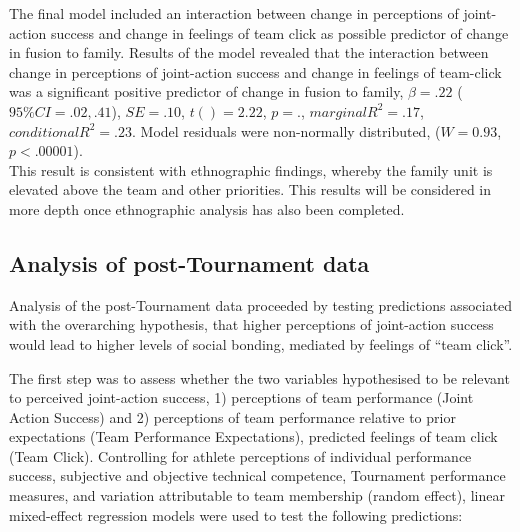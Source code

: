 {

The final model included an interaction between change in perceptions of joint-action success and change in feelings of team click as possible predictor of change in fusion to family.  Results of the model revealed that the interaction between change in perceptions of joint-action success and change in feelings of team-click was a significant positive predictor of change in fusion to family, $\beta = .22$ ($95\% CI =  .02, .41$), $SE = .10$, $t() = 2.22$, $p = .$, $marginal R^2 = .17$, $conditional R^2 = .23$. Model residuals were non-normally distributed, ($W = 0.93$, $p < .00001$).\\

This result is consistent with ethnographic findings, whereby the family unit is elevated above the team and other priorities.  This results will be considered in more depth once ethnographic analysis has also been completed.














\subsection{Analysis of post-Tournament data}
Analysis of the post-Tournament data proceeded by testing predictions associated with the overarching hypothesis, that higher perceptions of joint-action success would lead to higher levels of social bonding, mediated by feelings of ``team click''.

The first step was to assess whether the two variables hypothesised to be relevant to perceived joint-action success, 1) perceptions of team performance (Joint Action Success) and 2) perceptions of team performance relative to prior expectations (Team Performance Expectations), predicted feelings of team click (Team Click). Controlling for athlete perceptions of individual performance success, subjective and objective technical competence, Tournament performance measures, and variation attributable to team membership (random effect), linear mixed-effect regression models were used to test the following predictions:

}

